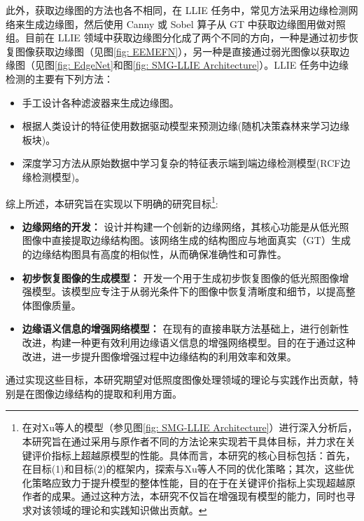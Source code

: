 \documentclass[a4paper, 10pt]{article}
\begin{document}
	此外，获取边缘图的方法也各不相同，在 LLIE 任务中，常见方法采用边缘检测网络来生成边缘图，然后使用 Canny 或 Sobel 算子\cite{maini2009study}从 GT 中获取边缘图用做对照组。目前在 LLIE 领域中获取边缘图分化成了两个不同的方向，一种是通过初步恢复图像获取边缘图（见图\ref{fig: EEMEFN}），另一种是直接通过弱光图像以获取边缘图（见图\ref{fig: EdgeNet}和图\ref{fig: SMG-LLIE Architecture}）。LLIE 任务中边缘检测的主要有下列方法：
	
	\begin{itemize}
		\item [(1)] 手工设计各种滤波器来生成边缘图。
		
		\item [(2)] 根据人类设计的特征使用数据驱动模型来预测边缘(随机决策森林来学习边缘板块)。
		
		\item [(3)] 深度学习方法从原始数据中学习复杂的特征表示端到端边缘检测模型(RCF边缘检测模型\cite{liu2017richer})。
	\end{itemize}
	
	综上所述，本研究旨在实现以下明确的研究目标\footnote{在对Xu等人\cite{xu2023low}的模型（参见图\ref{fig: SMG-LLIE Architecture}）进行深入分析后，本研究旨在通过采用与原作者不同的方法论来实现若干具体目标，并力求在关键评价指标上超越原模型的性能。具体而言，本研究的核心目标包括：首先，在目标(1)和目标(2)的框架内，探索与Xu等人不同的优化策略；其次，这些优化策略应致力于提升模型的整体性能，目的在于在关键评价指标上实现超越原作者的成果。通过这种方法，本研究不仅旨在增强现有模型的能力，同时也寻求对该领域的理论和实践知识做出贡献。}:
	
	\begin{itemize}
		\item [(1)] \textbf{边缘网络的开发：} 设计并构建一个创新的边缘网络，其核心功能是从低光照图像中直接提取边缘结构图。该网络生成的结构图应与地面真实（GT）生成的边缘结构图具有高度的相似性，从而确保准确性和可靠性。
		
		\item [(2)] \textbf{初步恢复图像的生成模型：} 开发一个用于生成初步恢复图像的低光照图像增强模型。该模型应专注于从弱光条件下的图像中恢复清晰度和细节，以提高整体图像质量。
		
		\item [(2)] \textbf{边缘语义信息的增强网络模型：} 在现有的直接串联方法基础上，进行创新性改进，构建一种更有效利用边缘语义信息的增强网络模型。目的在于通过这种改进，进一步提升图像增强过程中边缘结构的利用效率和效果。
	\end{itemize}
	
	通过实现这些目标，本研究期望对低照度图像处理领域的理论与实践作出贡献，特别是在图像边缘结构的提取和利用方面。
	
\end{document}
